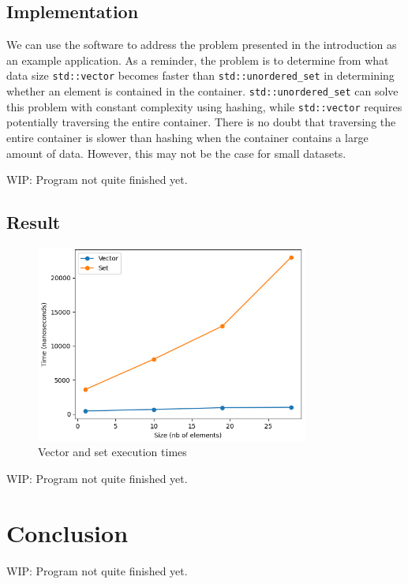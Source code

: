 \documentclass[conference]{IEEEtran}
\def\code#1{\texttt{#1}}
\begin{document}
\subsection{Implementation}

We can use the software to address the problem presented in the introduction as an example application. As a reminder, the problem is to determine from what data size \code{std::vector} becomes faster than \code{std::unordered\_set} in determining whether an element is contained in the container. \code{std::unordered\_set} can solve this problem with constant complexity using hashing, while \code{std::vector} requires potentially traversing the entire container. There is no doubt that traversing the entire container is slower than hashing when the container contains a large amount of data. However, this may not be the case for small datasets.

WIP: Program not quite finished yet.

\subsection{Result}



\begin{figure}[!h]
	\includegraphics[width=9cm]{Diagram/vector_vs_set.png}
	\caption{Vector and set execution times}
	\label{vector vs set}
\end{figure}

WIP: Program not quite finished yet.

\section{Conclusion}

WIP: Program not quite finished yet.



\end{document}
